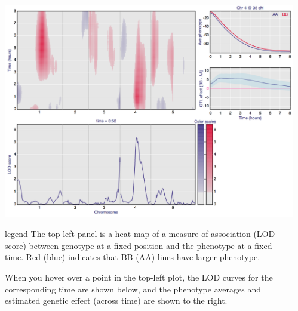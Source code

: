 \documentclass[final,plain]{beamer}
\newlength{\sepwid}
\newlength{\onecolwid}
\begin{document}
\begin{frame}[t]
\begin{columns}[t]
\begin{column}{\onecolwid}
    \centerline{\href{http://www.biostat.wisc.edu/~kbroman/posters/ENAR2014/2b}{\includegraphics[width=\onecolwid]{Figs/2b.png}}}

      \vspace{10mm} %

        \begin{beamercolorbox}[sep=1em, wd=\onecolwid]{legend} \rmfamily
        The top-left panel is a heat map of a measure of association (LOD
        score) between genotype at a fixed position and the phenotype
        at a fixed time.  Red (blue) indicates that BB (AA) lines have larger
        phenotype.
 
        \vspace{12pt}

        When you hover over a point in the top-left plot, the LOD curves for the
        corresponding time are shown below, and the phenotype averages and
        estimated genetic effect (across time) are shown to the right.
        \end{beamercolorbox}


  \end{column}

  \begin{column}{\sepwid}\end{column} %

\end{columns}


\end{frame}
\end{document}
